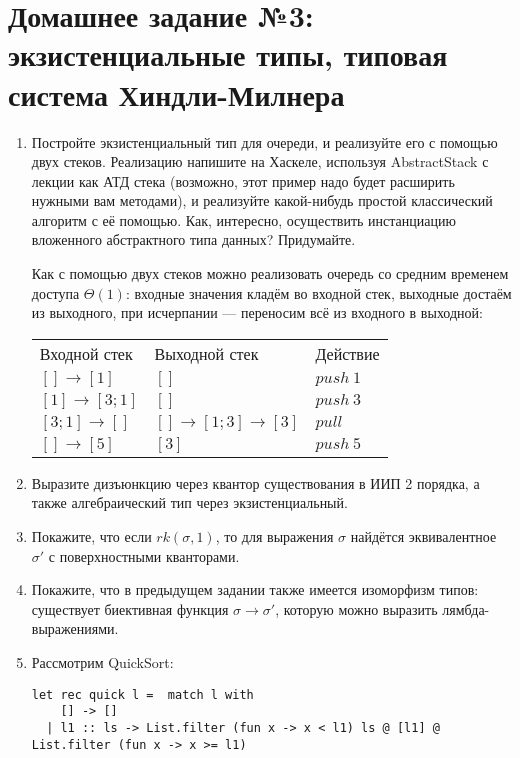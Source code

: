 \documentclass[10pt,a4paper,oneside]{article}
\begin{document}
\section*{Домашнее задание №3: экзистенциальные типы, типовая система Хиндли-Милнера}
\begin{enumerate}
\item Постройте экзистенциальный тип для очереди, и реализуйте его с помощью двух стеков.
Реализацию напишите на Хаскеле, используя AbstractStack с лекции как АТД стека 
(возможно, этот пример надо будет расширить нужными вам методами), и реализуйте 
какой-нибудь простой классический алгоритм с её помощью. Как, интересно, осуществить
инстанциацию вложенного абстрактного типа данных? Придумайте.

Как с помощью двух стеков можно реализовать очередь со средним временем доступа $\Theta(1)$:
входные значения кладём во входной стек, выходные достаём из выходного, при исчерпании ---
переносим всё из входного в выходной:

\begin{tabular}{lll}
Входной стек & Выходной стек & Действие\\
$[]\rightarrow[1]$ & $[]$ & $push\ 1$\\
$[1]\rightarrow[3;1]$ & $[]$ & $push\ 3$\\
$[3;1]\rightarrow[]$ & $[]\rightarrow[1;3]\rightarrow[3]$ & $pull$\\
$[]\rightarrow[5]$ & $[3]$ & $push\ 5$
\end{tabular}

\item Выразите дизъюнкцию через квантор существования в ИИП 2 порядка, а также алгебраический тип через экзистенциальный.

\item Покажите, что если $rk(\sigma,1)$, то для выражения $\sigma$ найдётся эквивалентное $\sigma'$ с поверхностными
кванторами. 

\item Покажите, что в предыдущем задании также имеется изоморфизм типов: существует биективная функция $\sigma\rightarrow\sigma'$,
которую можно выразить лямбда-выражениями.

\item Рассмотрим QuickSort:
\begin{verbatim}
let rec quick l =  match l with
    [] -> []
  | l1 :: ls -> List.filter (fun x -> x < l1) ls @ [l1] @ List.filter (fun x -> x >= l1)
\end{verbatim}


\end{enumerate}
\end{document}
